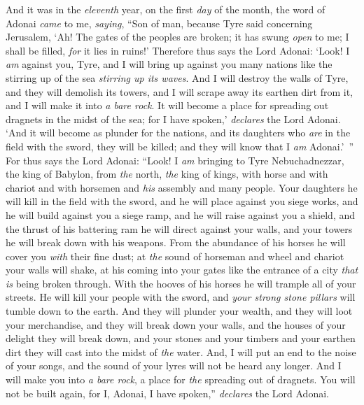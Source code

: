 \begin{biblechapter} %
 And it was in the \textit{eleventh} year, on the first \textit{day} of the month, the word of Adonai \textit{came} to me, \textit{saying},
\verse “Son of man, because Tyre said concerning Jerusalem, ‘Ah! The gates of the peoples are broken; it has swung \textit{open} to me; I shall be filled, \textit{for} it lies in ruins!’
\verse Therefore thus says the Lord Adonai: ‘Look! I \textit{am} against you, Tyre, and I will bring up against you many nations like the stirring up of the sea \textit{stirring up its waves}.
\verse And I will destroy the walls of Tyre, and they will demolish its towers, and I will scrape away its earthen dirt from it, and I will make it into \textit{a bare rock}.
\verse It will become a place for spreading out dragnets in the midst of the sea; for I have spoken,’ \textit{declares} the Lord Adonai. ‘And it will become as plunder for the nations,
\verse and its daughters who \textit{are} in the field with the sword, they will be killed; and they will know that I \textit{am} Adonai.’ ”
\verse For thus says the Lord Adonai: “Look! I \textit{am} bringing to Tyre Nebuchadnezzar, the king of Babylon, from \textit{the} north, \textit{the} king of kings, with horse and with chariot and with horsemen and \textit{his} assembly and many people.
\verse Your daughters he will kill in the field with the sword, and he will place against you siege works, and he will build against you a siege ramp, and he will raise against you a shield,
\verse and the thrust of his battering ram he will direct against your walls, and your towers he will break down with his weapons.
\verse From the abundance of his horses he will cover you \textit{with} their fine dust; at \textit{the} sound of horseman and wheel and chariot your walls will shake, at his coming into your gates like the entrance of a city \textit{that is} being broken through.
\verse With the hooves of his horses he will trample all of your streets. He will kill your people with the sword, and \textit{your strong stone pillars} will tumble down to the earth.
\verse And they will plunder your wealth, and they will loot your merchandise, and they will break down your walls, and the houses of your delight they will break down, and your stones and your timbers and your earthen dirt they will cast into the midst of \textit{the} water.
\verse And, I will put an end to the noise of your songs, and the sound of your lyres will not be heard any longer.
\verse And I will make you into \textit{a bare rock}, a place for \textit{the} spreading out of dragnets. You will not be built again, for I, Adonai, I have spoken,” \textit{declares} the Lord Adonai.

\end{biblechapter}
